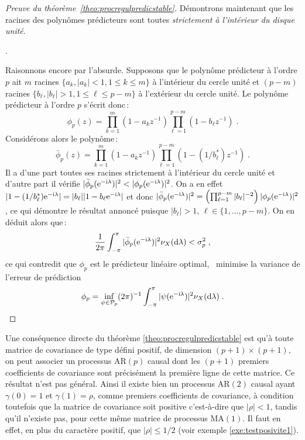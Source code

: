 \begin{proof}[Preuve du th\'eor\`eme~\ref{theo:procregulpredicstable}]
D\'emontrons maintenant que les racines des polyn\^omes
pr\'edicteurs sont toutes \emph{strictement à l'intérieur du disque unité}.

. 


Raisonnons encore par l'absurde. Supposons que le
polyn\^ome pr\'edicteur \`a l'ordre $p$ ait $m$ racines $\{a_k,
|a_k| < 1, 1 \le k \leq m \}$ \`a l'int\'erieur du cercle unit\'e et
$(p-m)$ racines $\{ b_{\ell}, |b_{\ell}| > 1, 1 \leq \ell \leq p-m
\}$ \`a l'ext\'erieur du cercle unit\'e. Le polyn\^ome pr\'edicteur
\`a l'ordre $p$ s'\'ecrit donc\,:
\[
 \phi_p(z)=
 \prod_{k=1}^m ( 1 - a_k z^{-1}) \prod_{\ell=1}^{p-m} (1 - b_{\ell} z^{-1})\;.
\]
Consid\'erons alors le polyn\^ome\,:
\[
 \bar{\phi}_p(z) =
 \prod_{k=1}^m (1 - a_k z^{-1}) \prod_{\ell=1}^{p-m} (1 - (1/b_{\ell}^{*}) z^{-1})\;.
\]
Il a d'une part toutes ses racines strictement \`a l'int\'erieur
du cercle unit\'e et d'autre part il v\'erifie
$|\bar{\phi}_p(\mathrm{e}^{-\mathrm{i}\lambda })|^2< |\phi_p(\mathrm{e}^{-\mathrm{i}\lambda })|^2$. On a
en effet $| 1 - (1/b_\ell^*) \mathrm{e}^{-\mathrm{i}\lambda } | = |b_\ell| |1 - b_\ell \mathrm{e}^{-\mathrm{i} \lambda }|$ et donc
$|\bar{\phi}_p(\mathrm{e}^{-\mathrm{i} \lambda })|^2 = \left (\prod_{\ell=1}^{p-m} |b_\ell|^{-2} \right )|\phi_p(\mathrm{e}^{-\mathrm{i}\lambda })|^2$, ce qui d\'emontre le r\'esultat
annonc\'e puisque $|b_\ell| >1$, $\ell \in \{1, \dots, p-m\}$. On en d\'eduit alors
que\,:
\begin{gather*}
\frac{1}{2 \pi} \int_{-\pi}^{\pi} | \bar{\phi}_p(\mathrm{e}^{-\mathrm{i}\lambda
})|^2 \nu_X(\mathrm{d}\lambda )   < \sigma_p^2\;,
\end{gather*}
ce qui contredit que $\phi_p$ est le prédicteur linéaire optimal, \ie\ minimise la variance de l'erreur de prédiction
\[
\phi_p=\inf_{\psi \in \mathcal{P}_p}(2\pi)^{-1}
\int_{-\pi}^\pi |\psi(\mathrm{e}^{-\mathrm{i}\lambda })|^2 \nu_X(\mathrm{d}\lambda ) \;.
\]

\end{proof}
Une cons\'equence directe du th\'eor\`eme
\ref{theo:procregulpredicstable} est qu'\`a toute matrice de
covariance de type d\'efini positif, de dimension $(p+1)\times
(p+1)$, on peut associer un processus AR$(p)$ causal dont les
$(p+1)$ premiers coefficients de covariance sont pr\'ecis\'ement la
premi\`ere ligne de cette matrice. Ce r\'esultat n'est pas g\'en\'eral.
Ainsi il existe bien un processus AR$(2)$ causal ayant
$\gamma(0)=1$ et $\gamma(1)=\rho$, comme premiers coefficients de
covariance, \`a condition toutefois que la matrice de covariance
soit positive c'est-\`a-dire que $|\rho|<1$, tandis qu'il n'existe
pas, pour cette m\^{e}me matrice de processus MA$(1)$. Il faut en
effet, en plus du caract\`ere positif, que $|\rho|\leq 1/2$
(voir exemple \ref{exe:testposivite1}).

